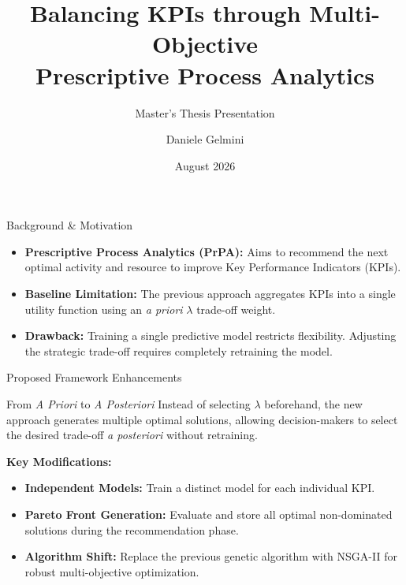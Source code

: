 \documentclass[aspectratio=169]{beamer} %
\title[Multi-Objective PrPA]{Balancing KPIs through Multi-Objective\\Prescriptive Process Analytics}
\subtitle{Master's Thesis Presentation}
\author{Daniele Gelmini}
\institute[UniPD]{Dipartimento di Matematica “Tullio Levi-Civita”\\Università degli Studi di Padova}
\date{August 2026}
\begin{document}
\frame{\titlepage}

\begin{frame}{Background \& Motivation}
    \begin{itemize}
        \item \textbf{Prescriptive Process Analytics (PrPA):} Aims to recommend the next optimal activity and resource to improve Key Performance Indicators (KPIs).
        \item \textbf{Baseline Limitation:} The previous approach aggregates KPIs into a single utility function using an \textit{a priori} $\lambda$ trade-off weight.
        \item \textbf{Drawback:} Training a single predictive model restricts flexibility. Adjusting the strategic trade-off requires completely retraining the model.
    \end{itemize}
\end{frame}

\begin{frame}{Proposed Framework Enhancements}
    \begin{block}{From \textit{A Priori} to \textit{A Posteriori}}
        Instead of selecting $\lambda$ beforehand, the new approach generates multiple optimal solutions, allowing decision-makers to select the desired trade-off \textit{a posteriori} without retraining.
    \end{block}
    \vspace{0.3cm}
    \textbf{Key Modifications:}
    \begin{itemize}
        \item \textbf{Independent Models:} Train a distinct model for each individual KPI.
        \item \textbf{Pareto Front Generation:} Evaluate and store all optimal non-dominated solutions during the recommendation phase.
        \item \textbf{Algorithm Shift:} Replace the previous genetic algorithm with NSGA-II for robust multi-objective optimization.
    \end{itemize}
\end{frame}
\end{document}
